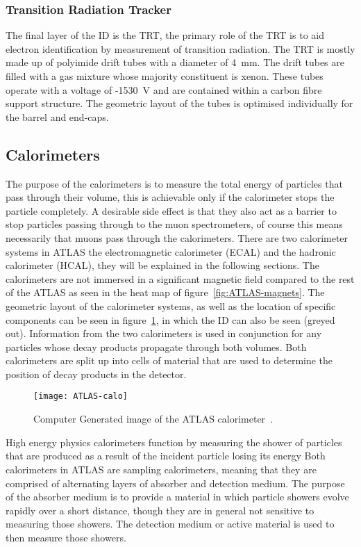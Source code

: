 \subsubsection{Transition Radiation Tracker}

The final layer of the ID is the TRT, the primary role of the TRT is to aid
electron identification by measurement of transition radiation. The TRT is
mostly made up of polyimide drift tubes with a diameter of 4~mm. The drift tubes
are filled with a gas mixture whose majority constituent is xenon. These tubes
operate with a voltage of -1530~V and are contained within a carbon fibre
support structure. The geometric layout of the tubes is optimised individually for
the barrel and end-caps.

\subsection{Calorimeters}%
\label{sec:calo}

The purpose of the calorimeters is to measure the total energy of particles that
pass through their volume, this is achievable only if the calorimeter
stops the particle completely. A desirable side effect is that they also act as
a barrier to stop particles passing through to the muon spectrometers, of course
this means necessarily that muons pass through the calorimeters. There are two
calorimeter systems in ATLAS the electromagnetic calorimeter (ECAL) and the
hadronic calorimeter (HCAL), they will be explained in the following sections.
The calorimeters are not immersed in a significant magnetic field compared to
the rest of the ATLAS as seen in the heat map of figure~\ref{fig:ATLAS-magnets}.
The geometric layout of the calorimeter systems, as well as the location of
specific components can be seen in figure~\ref{fig:ATLAS-calo}, in which the ID
can also be seen (greyed out). Information from the two calorimeters is used in
conjunction for any particles whose decay products propagate through both
volumes. Both calorimeters are split up into cells of material that are used to
determine the position of decay products in the detector.
\begin{figure}[ht]
  \centering
  \texttt{[image: ATLAS-calo]}
  \caption[ATLAS Calorimeter]{Computer Generated image of the ATLAS
    calorimeter~\cite{ATLAS-calo-fig}.}%
  \label{fig:ATLAS-calo}
\end{figure}

High energy physics calorimeters function by measuring the shower
of particles that are produced as a result of the incident particle losing its
energy Both calorimeters in ATLAS are sampling calorimeters, meaning that they
are comprised of alternating layers of absorber and detection medium. The purpose
of the absorber medium is to provide a material in which particle showers evolve
rapidly over a short distance, though they are in general not sensitive to
measuring those showers. The detection medium or active material is used to then
measure those showers.

